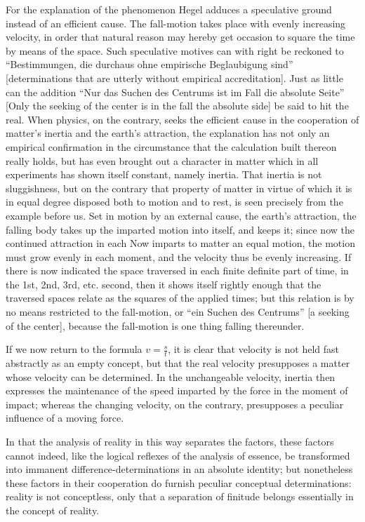 \documentclass[12pt]{book}
\begin{document}
For the explanation of the phenomenon Hegel adduces a speculative ground instead of an efficient cause.
The fall-motion takes place with evenly increasing velocity, in order that natural reason may hereby get
occasion to square the time by means of the space. Such speculative motives can with right be reckoned to
``Bestimmungen, die durchaus ohne empirische Beglaubigung sind'' [determinations that are utterly without
empirical accreditation]. Just as little can the addition ``Nur das Suchen des Centrums ist im Fall die
absolute Seite'' [Only the seeking of the center is in the fall the absolute side] be said to hit the
real. When physics, on the contrary, seeks the efficient cause in the cooperation of matter's inertia and
the earth's attraction, the explanation has not only an empirical confirmation in the circumstance that
the calculation built thereon really holds, but has even brought out a character in matter which in all
experiments has shown itself constant, namely inertia. That inertia is not sluggishness, but on the
contrary that property of matter in virtue of which it is in equal
degree disposed both to motion and to rest, is seen precisely from the example before us. Set in motion by
an external cause, the earth's attraction, the falling body takes up the imparted motion into itself, and
keeps it; since now the continued attraction in each Now imparts to matter an equal motion, the motion must
grow evenly in each moment, and the velocity thus be evenly increasing. If there is now indicated the space
traversed in each finite definite part of time, in the 1st, 2nd, 3rd, etc. second, then it shows itself
rightly enough that the traversed spaces relate as the squares of the applied times; but this relation is
by no means restricted to the fall-motion, or ``ein Suchen des Centrums'' [a seeking of the center],
because the fall-motion is one thing falling thereunder.

If we now return to the formula $v = \frac{s}{t}$, it is clear that velocity is not held fast abstractly
as an empty concept, but that the real velocity presupposes a matter whose velocity can be determined. In
the unchangeable velocity, inertia then expresses the maintenance of the speed imparted by the force in the
moment of impact; whereas the changing velocity, on the contrary, presupposes a peculiar influence of a
moving force.

In that the analysis of reality in this way separates the factors, these factors cannot indeed, like the
logical reflexes of the analysis of essence, be transformed into immanent difference-determinations in an
absolute identity; but nonetheless these factors in their cooperation do furnish peculiar conceptual
determinations: reality is not conceptless, only that a separation of finitude belongs essentially in the
concept of reality.
\end{document}
